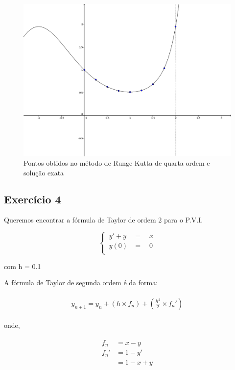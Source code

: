 \documentclass[paper=a4, fontsize=12pt]{scrartcl}
\numberwithin{equation}{section} %
\numberwithin{figure}{section} %
\numberwithin{table}{section} %
\begin{document}
 		\begin{figure}[H]
 			\centering
 			\includegraphics[scale=0.25]{grafedo3.png}
 			\caption{Pontos obtidos no método de Runge Kutta de quarta ordem e solução exata}
 		\end{figure}

		\subsection{Exercício 4}

		Queremos encontrar a fórmula de Taylor de ordem 2 para o P.V.I.

		\[
		\begin{cases}
		\ y' + y &= \quad x \\
		\ y(0) &= \quad 0\\
		\end{cases}
		\]

		com h = 0.1

		A fórmula de Taylor de segunda ordem é da forma:

		\begin{align*}
			\begin{split}
				y_{n + 1} = y_n + (h\times f_n) + (\frac{h^2}{2} \times f_n')
			\end{split}
		\end{align*}

		onde,

		\begin{align*}
			\begin{split}
				f_n &= x - y \\
				f_n' &= 1 - y' \\
						&= 1 - x + y \\
			\end{split}
		\end{align*}
\end{document}
